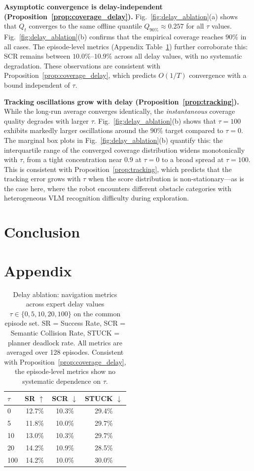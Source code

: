 \documentclass[letterpaper, 10 pt, conference]{ieeeconf}  %
\begin{document}
\textbf{Asymptotic convergence is delay-independent (Proposition~\ref{prop:coverage_delay}).}
Fig.~\ref{fig:delay_ablation}(a) shows that $Q_t$ converges to the same offline quantile $Q_{90\%} \approx 0.257$ for all $\tau$ values. Fig.~\ref{fig:delay_ablation}(b) confirms that the empirical coverage reaches $90\%$ in all cases. The episode-level metrics (Appendix Table~\ref{tab:delay_ablation}) further corroborate this: SCR remains between $10.0\%$--$10.9\%$ across all delay values, with no systematic degradation. These observations are consistent with Proposition~\ref{prop:coverage_delay}, which predicts $O(1/T)$ convergence with a bound independent of $\tau$.

\textbf{Tracking oscillations grow with delay (Proposition~\ref{prop:tracking}).}
While the long-run average converges identically, the \emph{instantaneous} coverage quality degrades with larger $\tau$. Fig.~\ref{fig:delay_ablation}(b) shows that $\tau = 100$ exhibits markedly larger oscillations around the $90\%$ target compared to $\tau = 0$. The marginal box plots in Fig.~\ref{fig:delay_ablation}(b) quantify this: the interquartile range of the converged coverage distribution widens monotonically with $\tau$, from a tight concentration near $0.9$ at $\tau = 0$ to a broad spread at $\tau = 100$. This is consistent with Proposition~\ref{prop:tracking}, which predicts that the tracking error grows with $\tau$ when the score distribution is non-stationary---as is the case here, where the robot encounters different obstacle categories with heterogeneous VLM recognition difficulty during exploration.


\section{Conclusion}





\newpage
\section*{Appendix}

\begin{table}[h]
\caption{Delay ablation: navigation metrics across expert delay values $\tau \in \{0, 5, 10, 20, 100\}$ on the common episode set. SR = Success Rate, SCR = Semantic Collision Rate, STUCK = planner deadlock rate. All metrics are averaged over 128 episodes. Consistent with Proposition~\ref{prop:coverage_delay}, the episode-level metrics show no systematic dependence on $\tau$.}
\label{tab:delay_ablation}
\centering
\begin{tabular}{lccc}
\toprule
$\tau$ & \textbf{SR} $\uparrow$ & \textbf{SCR} $\downarrow$ & \textbf{STUCK} $\downarrow$ \\
\midrule
0   & 12.7\% & 10.3\% & 29.4\% \\
5   & 11.8\% & 10.0\% & 29.7\% \\
10  & 13.0\% & 10.3\% & 29.7\% \\
20  & 14.2\% & 10.9\% & 28.5\% \\
100 & 14.2\% & 10.0\% & 30.0\% \\
\bottomrule
\end{tabular}
\end{table}
\end{document}
